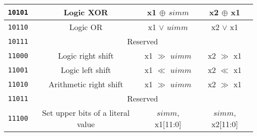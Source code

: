 \begin{center}
\begin{longtable}{|c|c|c|c|}
      \texttt{10101}                     &
      Logic XOR                          &
      x1 $\oplus$ $simm$                 &
      x2 $\oplus$ x1                     \\ \hline
                                         
      \texttt{10110}                     &
      Logic OR                           &
      x1 $\lor$ $uimm$                   &
      x2 $\lor$ x1                       \\ \hline
                                         
      \texttt{10111}                     &
      \multicolumn{3}{c|}{Reserved}      \\ \hline

      \texttt{11000}                     &
      Logic right shift                  &
      x1 $\gg$ $uimm$                    &
      x2 $\gg$ x1                        \\ \hline
                                         
      \texttt{11001}                     &
      Logic left shift                   &
      x1 $\ll$ $uimm$                    &
      x2 $\ll$ x1                        \\ \hline
                                         
      \texttt{11010}                     &                      
      Arithmetic right shift             &
      x1 $\gg$ $uimm$                    &
      x2 $\gg$ x1                        \\ \hline

      \texttt{11011}                     &
      \multicolumn{3}{c|}{Reserved}      \\ \hline

      \texttt{11100}                     &
      Set upper bits of a literal value  &
      {$simm$, x1[11:0]}                 &   
      {$simm$, x2[11:0]}                 \\ \hline
 

\end{longtable}
\end{center}
